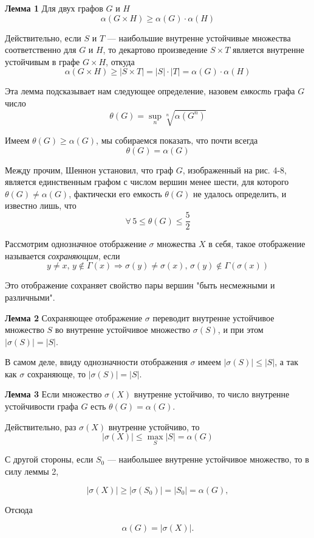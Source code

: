 \textbf{Лемма 1} Для двух графов $G$ и $H$
\[
\alpha(G \times H) \geq \alpha(G) \cdot \alpha(H)
\]

Действительно, если $S$ и $T$ — наибольшие внутренне устойчивые множества соответственно для $G$ и $H$, то декартово произведение $S \times T$ является внутренне устойчивым в графе $G \times H$, откуда
\[
\alpha(G \times H) \geq |S \times T| = |S| \cdot |T| = \alpha(G) \cdot \alpha(H)
\]

Эта лемма подсказывает нам следующее определение, назовем \emph{емкость} графа $G$ число
\[
\theta(G) = \sup_{n} \sqrt[n]{\alpha(G^n)}
\]

Имеем $\theta(G) \geq \alpha(G)$, мы собираемся показать, что почти всегда
\[
\theta(G) = \alpha(G)
\]

Между прочим, Шеннон установил, что граф $G$, изображенный на рис. 4-8, является единственным графом с числом вершин менее шести, для которого $\theta(G) \neq \alpha(G)$, фактически его емкость $\theta(G)$ не удалось определить, и известно лишь, что
\[
\forall \, 5 \leq \theta(G) \leq \frac{5}{2}
\]

Рассмотрим однозначное отображение $\sigma$ множества $X$ в себя, такое отображение называется \emph{сохраняющим}, если
\[
y \neq x, \, y \notin \Gamma(x) \Rightarrow \sigma(y) \neq \sigma(x), \, \sigma(y) \notin \Gamma(\sigma(x))
\]

Это отображение сохраняет свойство пары вершин "быть несмежными и различными".

\textbf{Лемма 2} Сохраняющее отображение $\sigma$ переводит внутренне устойчивое множество $S$ во внутренне устойчивое множество $\sigma(S)$, и при этом $|\sigma(S)| = |S|$.

В самом деле, ввиду однозначности отображения $\sigma$ имеем $|\sigma(S)| \leq |S|$, а так как $\sigma$ сохраняюще, то $|\sigma(S)| = |S|$.

\textbf{Лемма 3} Если множество $\sigma(X)$ внутренне устойчиво, то число внутренне устойчивости графа $G$ есть $\theta(G) = \alpha(G)$.

Действительно, раз $\sigma(X)$ внутренне устойчиво, то
\[
|\sigma(X)| \leq \max_{S} |S| = \alpha(G)
\]

С другой стороны, если $S_0$ — наибольшее внутренне устойчивое множество, то в силу леммы 2,

\[
|\sigma(X)| \geq |\sigma(S_0)| = |S_0| = \alpha(G),
\]

Отсюда

\[
\alpha(G) = |\sigma(X)|.
\]

